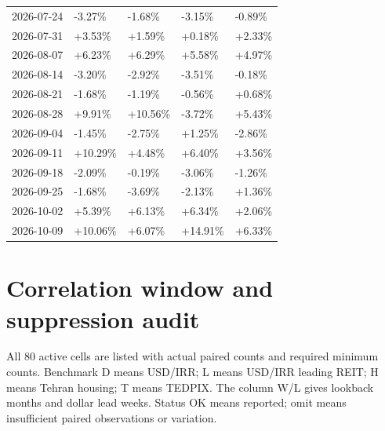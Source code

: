 \documentclass[11pt,a4paper]{article}
\begin{document}
\begin{longtable}{lllll}
2026-07-24 & -3.27\% & -1.68\% & -3.15\% & -0.89\% \\
2026-07-31 & +3.53\% & +1.59\% & +0.18\% & +2.33\% \\
2026-08-07 & +6.23\% & +6.29\% & +5.58\% & +4.97\% \\
2026-08-14 & -3.20\% & -2.92\% & -3.51\% & -0.18\% \\
2026-08-21 & -1.68\% & -1.19\% & -0.56\% & +0.68\% \\
2026-08-28 & +9.91\% & +10.56\% & -3.72\% & +5.43\% \\
2026-09-04 & -1.45\% & -2.75\% & +1.25\% & -2.86\% \\
2026-09-11 & +10.29\% & +4.48\% & +6.40\% & +3.56\% \\
2026-09-18 & -2.09\% & -0.19\% & -3.06\% & -1.26\% \\
2026-09-25 & -1.68\% & -3.69\% & -2.13\% & +1.36\% \\
2026-10-02 & +5.39\% & +6.13\% & +6.34\% & +2.06\% \\
2026-10-09 & +10.06\% & +6.07\% & +14.91\% & +6.33\% \\
\bottomrule\end{longtable}\endgroup

\section{Correlation window and suppression audit}

All 80 active cells are listed with actual paired counts and required minimum counts. Benchmark D means USD/IRR; L means USD/IRR leading REIT; H means Tehran housing; T means TEDPIX. The column W/L gives lookback months and dollar lead weeks. Status OK means reported; omit means insufficient paired observations or variation.
\end{document}
